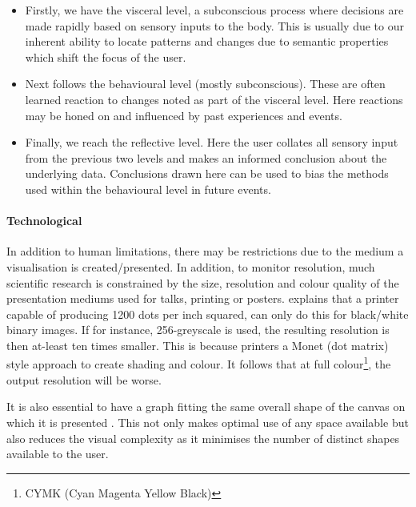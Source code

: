 \begin{itemize}
\item[1.] Firstly, we have the visceral level, a subconscious process where decisions are made rapidly based on sensory inputs to the body.
This is usually due to our inherent ability to locate patterns and changes due to semantic properties which shift the focus of the user.

\item[2.] Next follows the behavioural level (mostly subconscious). These are often learned reaction to changes noted as part of the visceral level. Here reactions may be honed on and influenced by past experiences and events.

\item[3.] Finally, we reach the reflective level. Here the user collates all sensory input from the previous two levels and makes an informed conclusion about the underlying data. Conclusions drawn here can be used to bias the methods used within the behavioural level in future events.
\end{itemize}

\paragraph{Technological}
In addition to human limitations, there may be restrictions due to the medium a visualisation is created/presented. In addition, to monitor resolution, much scientific research is constrained by the size, resolution and colour quality of the presentation mediums used for talks, printing or posters. \cite{ware} explains that a printer capable of producing 1200 dots per inch squared, can only do this for black/white binary images. If for instance, 256-greyscale is used, the resulting resolution is then at-least ten times smaller. This is because printers a Monet (dot matrix) style approach to create shading and colour. It follows that at full colour\footnote{CYMK (Cyan Magenta Yellow Black)}, the output resolution will be worse.

It is also essential to have a graph fitting the same overall shape of the canvas on which it is presented \citep{graphmetnew}. This not only makes optimal use of any space available but also reduces the visual complexity as it minimises the number of distinct shapes available to the user.









